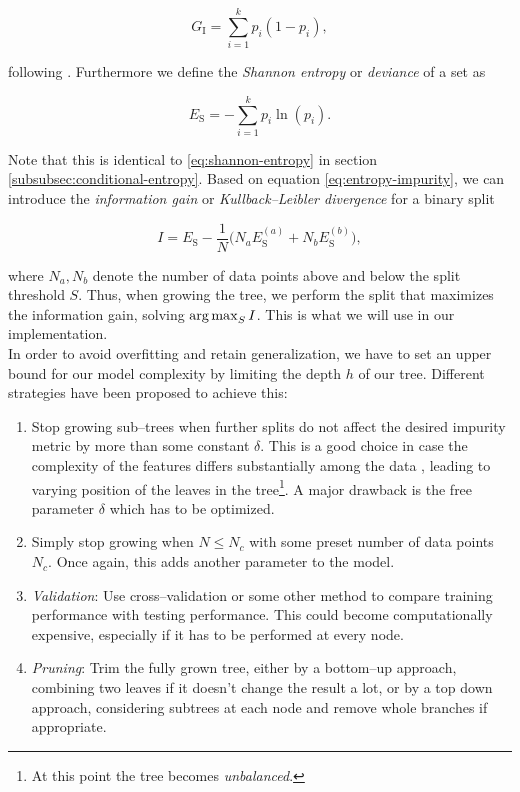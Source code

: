 \begin{equation}
\label{eq:gini-impurity}
G_{\text{I}} = \sum\limits_{i=1}^k p_i (1 - p_i),
\end{equation}

following \citet{astroML,hastie2001,ripley2007}. Furthermore we define the \emph{Shannon entropy} or \emph{deviance} of a set as

\begin{equation}
\label{eq:entropy-impurity}
E_{\text{S}} = - \sum\limits_{i=1}^k p_i \ln(p_i).
\end{equation}

Note that this is identical to \eqref{eq:shannon-entropy} in section \ref{subsubsec:conditional-entropy}. Based on equation \eqref{eq:entropy-impurity}, we can introduce the \emph{information gain} or \emph{Kullback--Leibler divergence} \citep{kullback1951} for a binary split

\begin{equation}
\label{eq:information-gain}
I = E_{\text{S}} - \frac{1}{N} \big(N_a E_{\text{S}}^{(a)} + N_b E_{\text{S}}^{(b)}\big),
\end{equation}

where $N_a, N_b$ denote the number of data points above and below the split threshold $S$. Thus, when growing the tree, we perform the split that maximizes the information gain, \ie solving $\operatorname*{arg\,max}_S I$. This is what we will use in our implementation.\\

In order to avoid overfitting and retain generalization, we have to set an upper bound for our model complexity by limiting the depth $h$ of our tree. Different strategies have been proposed to achieve this:

\begin{enumerate}
\item \label{itm:constant-metric} Stop growing sub--trees when further splits do not affect the desired impurity metric by more than some constant $\delta$. This is a good choice in case the complexity of the features differs substantially among the data \citep{duda2001}, leading to varying position of the leaves in the tree\footnote{At this point the tree becomes \emph{unbalanced}.}. A major drawback is the free parameter $\delta$ which has to be optimized.
\item \label{itm:constant-data-points} Simply stop growing when $N \le N_c$ with some preset number of data points $N_c$. Once again, this adds another parameter to the model.
\item \label{itm:validation} \emph{Validation}: Use cross--validation or some other method to compare training performance with testing performance. This could become computationally expensive, especially if it has to be performed at every node.
\item \label{itm:pruning} \emph{Pruning}: Trim the fully grown tree, either by a bottom--up approach, \ie combining two leaves if it doesn't change the result a lot, or by a top down approach, considering subtrees at each node and remove whole branches if appropriate.
\end{enumerate}

